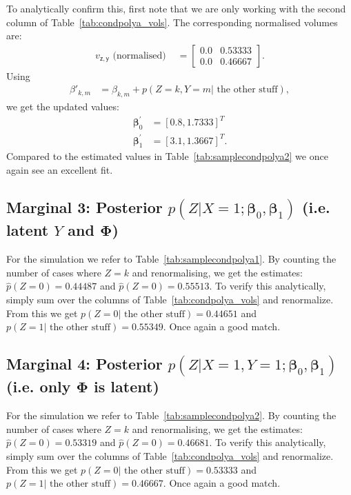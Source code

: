 \documentclass[oneside,english]{scrbook}
\begin{document}
To analytically confirm this, first note that we are only working with
the second column of Table~\ref{tab:condpolya_vols}. The corresponding
normalised volumes are:
\begin{align*}
  v_{\mathsf{z,y}} \text{ (normalised) }
  &= \left[
    \begin{array}{cc}
      0.0 & 0.53333\\
      0.0 & 0.46667
    \end{array}
    \right].
\end{align*}
Using
\begin{align*}
  \beta'_{k,m} &= \beta_{k,m}+p(Z=k,Y=m|\text{ the other stuff}),
\end{align*}
we get the updated values:
\begin{align*}
  \bm{\beta}^{'}_0 &= [0.8,1.7333]^T\\
  \bm{\beta}^{'}_1 &= [3.1, 1.3667]^T.
\end{align*}
Compared to the estimated values in Table~\ref{tab:samplecondpolya2} we
once again see an excellent fit.

\subsection{Marginal 3: Posterior $p(Z|X=1;\bm{\beta}_0,\bm{\beta}_1)$ (i.e. latent $Y$ and $\bm{\Phi}$)}

For the simulation we refer to Table~\ref{tab:samplecondpolya1}. By
counting the number of cases where $Z=k$ and renormalising, we get the
estimates: $\hat{p}(Z=0) = 0.44487$ and $\hat{p}(Z=0) = 0.55513$.  To
verify this analytically, simply sum over the columns of
Table~\ref{tab:condpolya_vols} and renormalize. From this we get
$p(Z=0|\text{ the other stuff}) = 0.44651$ and $p(Z=1|\text{ the other
  stuff}) = 0.55349$. Once again a good match.

\subsection{Marginal 4: Posterior $p(Z|X=1,Y=1;\bm{\beta}_0,\bm{\beta}_1)$ (i.e. only $\bm{\Phi}$ is latent)}

For the simulation we refer to Table~\ref{tab:samplecondpolya2}. By
counting the number of cases where $Z=k$ and renormalising, we get the
estimates: $\hat{p}(Z=0) = 0.53319$ and $\hat{p}(Z=0) = 0.46681$.  To
verify this analytically, simply sum over the columns of
Table~\ref{tab:condpolya_vols} and renormalize. From this we get
$p(Z=0|\text{ the other stuff}) = 0.53333$ and $p(Z=1|\text{ the other
  stuff}) = 0.46667$. Once again a good match.
\end{document}
